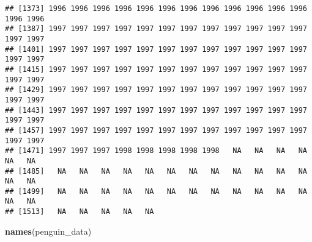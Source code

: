 \documentclass[
]{article}
\newenvironment{Shaded}{\begin{snugshade}}{\end{snugshade}}
\newcommand{\FunctionTok}[1]{\textcolor[rgb]{0.13,0.29,0.53}{\textbf{#1}}}
\newcommand{\NormalTok}[1]{#1}
\begin{document}
\begin{verbatim}
## [1373] 1996 1996 1996 1996 1996 1996 1996 1996 1996 1996 1996 1996 1996 1996
## [1387] 1997 1997 1997 1997 1997 1997 1997 1997 1997 1997 1997 1997 1997 1997
## [1401] 1997 1997 1997 1997 1997 1997 1997 1997 1997 1997 1997 1997 1997 1997
## [1415] 1997 1997 1997 1997 1997 1997 1997 1997 1997 1997 1997 1997 1997 1997
## [1429] 1997 1997 1997 1997 1997 1997 1997 1997 1997 1997 1997 1997 1997 1997
## [1443] 1997 1997 1997 1997 1997 1997 1997 1997 1997 1997 1997 1997 1997 1997
## [1457] 1997 1997 1997 1997 1997 1997 1997 1997 1997 1997 1997 1997 1997 1997
## [1471] 1997 1997 1997 1998 1998 1998 1998 1998   NA   NA   NA   NA   NA   NA
## [1485]   NA   NA   NA   NA   NA   NA   NA   NA   NA   NA   NA   NA   NA   NA
## [1499]   NA   NA   NA   NA   NA   NA   NA   NA   NA   NA   NA   NA   NA   NA
## [1513]   NA   NA   NA   NA   NA
\end{verbatim}

\begin{Shaded}
\begin{Highlighting}[]
\FunctionTok{names}\NormalTok{(penguin\_data)}
\end{Highlighting}
\end{Shaded}
\end{document}
